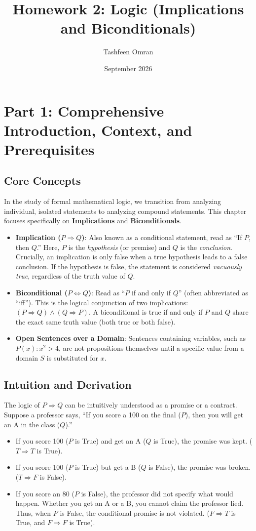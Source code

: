 \documentclass[11pt]{article}
\title{\textbf{Homework 2: Logic (Implications and Biconditionals)}}
\author{Tashfeen Omran}
\date{September 2026}
\begin{document}
\maketitle

\tableofcontents
\newpage

\section{Part 1: Comprehensive Introduction, Context, and Prerequisites}

\subsection{Core Concepts}
In the study of formal mathematical logic, we transition from analyzing individual, isolated statements to analyzing compound statements. This chapter focuses specifically on \textbf{Implications} and \textbf{Biconditionals}.
\begin{itemize}
    \item \textbf{Implication ($P \Rightarrow Q$)}: Also known as a conditional statement, read as ``If $P$, then $Q$.'' Here, $P$ is the \textit{hypothesis} (or premise) and $Q$ is the \textit{conclusion}. Crucially, an implication is only false when a true hypothesis leads to a false conclusion. If the hypothesis is false, the statement is considered \textit{vacuously true}, regardless of the truth value of $Q$.
    \item \textbf{Biconditional ($P \Leftrightarrow Q$)}: Read as ``$P$ if and only if $Q$'' (often abbreviated as ``iff''). This is the logical conjunction of two implications: $(P \Rightarrow Q) \wedge (Q \Rightarrow P)$. A biconditional is true if and only if $P$ and $Q$ share the exact same truth value (both true or both false).
    \item \textbf{Open Sentences over a Domain}: Sentences containing variables, such as $P(x): x^2 > 4$, are not propositions themselves until a specific value from a domain $S$ is substituted for $x$. 
\end{itemize}

\subsection{Intuition and Derivation}
The logic of $P \Rightarrow Q$ can be intuitively understood as a promise or a contract. Suppose a professor says, ``If you score a 100 on the final ($P$), then you will get an A in the class ($Q$).'' 
\begin{itemize}
    \item If you score 100 ($P$ is True) and get an A ($Q$ is True), the promise was kept. ($T \Rightarrow T$ is True).
    \item If you score 100 ($P$ is True) but get a B ($Q$ is False), the promise was broken. ($T \Rightarrow F$ is False).
    \item If you score an 80 ($P$ is False), the professor did not specify what would happen. Whether you get an A or a B, you cannot claim the professor lied. Thus, when $P$ is False, the conditional promise is not violated. ($F \Rightarrow T$ is True, and $F \Rightarrow F$ is True).
\end{itemize}
\end{document}
